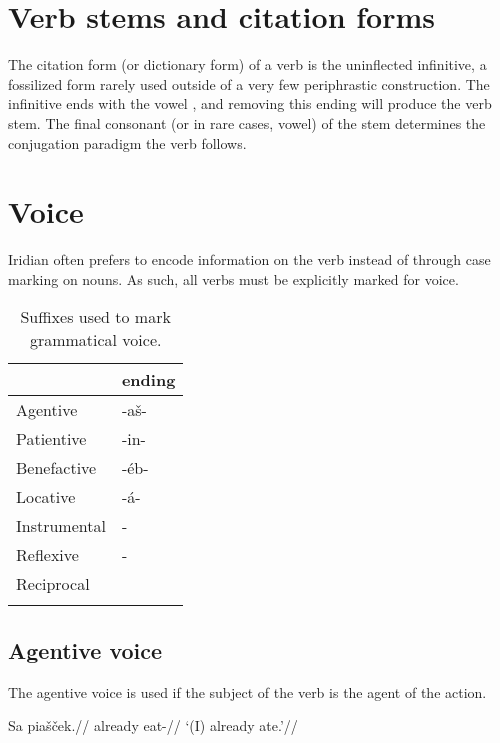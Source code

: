 \section{Verb stems and citation forms}

\par The citation form (or dictionary form) of a verb is the uninflected infinitive, a fossilized form rarely used outside of a very few periphrastic construction. The infinitive ends with the vowel , and removing this ending will produce the verb stem. The final consonant (or in rare cases, vowel) of the stem determines the conjugation paradigm the verb follows.

\section{Voice}

Iridian often prefers to encode information on the verb instead of through case marking on nouns. As such, all verbs must be explicitly marked for voice.
\begin{table}[h!]
	\small \centering
	\caption{Suffixes used to mark grammatical voice.}
	\begin{tabu} to 0.8\textwidth{YM}
		\toprule
		&{\sc ending}\\
		\midrule
		Agentive	& -a\v{s}-\\ \addlinespace
		Patientive	& -in-\\ \addlinespace
		Benefactive	& -\'eb-\\ \addlinespace
		Locative	& -á-\\ \addlinespace
		Instrumental& -\\ \addlinespace
		Reflexive	& -\\ \addlinespace
		Reciprocal	& \\ \addlinespace
		\bottomrule
	\end{tabu}
\end{table}


\subsection{Agentive voice}
\par The agentive voice is used if the subject of the verb is the agent of the action.

\pex
\begingl
\gla Sa pia\v{s}\v{c}ek.//
\glb already eat-//
\glft `(I) already ate.'//
\endgl
\xe

